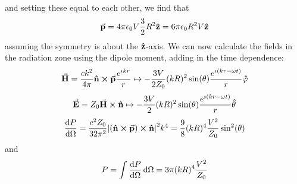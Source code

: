 \documentclass[a4paper,twoside]{article}
\begin{document}
\begin{problem}
\begin{equation}
    \end{equation}
    and setting these equal to each other, we find that
    \begin{equation}
        \va{p} = 4 \pi \epsilon_0 V \frac{3}{2} R^2 \vu{z} = 6 \pi \epsilon_0 R^2 V \vu{z}
    \end{equation}
    assuming the symmetry is about the $ \vu{z} $-axis. We can now calculate the fields in the radiation zone using the dipole moment, adding in the time dependence:
    \begin{equation}
        \va{H} = \frac{c k^2}{4 \pi} \vu{n} \cross \va{p} \frac{e^{\imath kr}}{r} \mapsto - \frac{3V}{2Z_0} (kR)^2 \sin(\theta) \frac{e^{\imath (kr - \omega t)}}{r} \vu{\varphi} 
    \end{equation}
    \begin{equation}
        \va{E} = Z_0 \va{H} \cross \vu{n} \mapsto - \frac{3V}{2} (kR)^2 \sin(\theta) \frac{e^{\imath (kr - \omega t)}}{r} \vu{\theta}
    \end{equation}
    \begin{equation}
        \dv{P}{\Omega} = \frac{c^2 Z_0}{32 \pi^2} \abs{( \vu{n} \cross \va{p}) \cross \vu{n}}^2 k^4 = \frac{9}{8} (kR)^{4} \frac{V^2}{Z_0} \sin[2](\theta)
    \end{equation}
    and
    \begin{equation}
        P = \int \dv{P}{\Omega} \dd{\Omega} = 3 \pi (kR)^4 \frac{V^2}{Z_0}
    \end{equation}
\end{problem}
\end{document}
